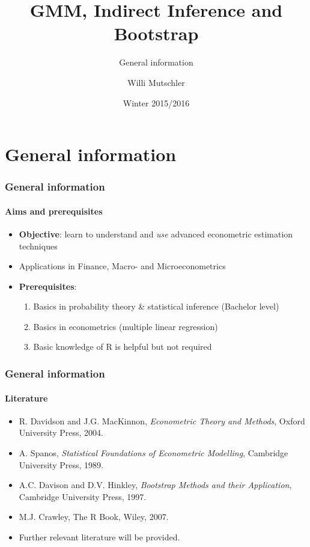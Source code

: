 \documentclass[notes=show]{beamer}
\begin{document}
\title{GMM, Indirect Inference and Bootstrap}
\subtitle{General information}
\author[Willi Mutschler]{Willi Mutschler}
\date{Winter 2015/2016}
\maketitle

\section{General information}

\begin{frame}\frametitle{General information}\framesubtitle{Aims and prerequisites}
    \begin{itemize}
        \item \textbf{Objective}: learn to understand and \emph{use} advanced econometric estimation techniques
        \item Applications in Finance, Macro- and Microeconometrics
        \item \textbf{Prerequisites}:
        \begin{enumerate}
            \item Basics in probability theory \& statistical inference (Bachelor level)
            \item Basics in econometrics (multiple linear regression)
            \item Basic knowledge of R is helpful but not required
        \end{enumerate}
        \end{itemize}
\end{frame}

\begin{frame}\frametitle{General information}\framesubtitle{Literature}
    \begin{itemize}
        \item R. Davidson and J.G. MacKinnon, \emph{Econometric Theory and Methods}, Oxford University Press, 2004.
        \item A. Spanos, \emph{Statistical Foundations of Econometric Modelling}, Cambridge University Press, 1989.
        \item A.C. Davison and D.V. Hinkley, \emph{Bootstrap Methods and their Application}, Cambridge University Press, 1997.
        \item M.J. Crawley, The R Book, Wiley, 2007.
        \item Further relevant literature will be provided.
    \end{itemize}
\end{frame}
\end{document}
